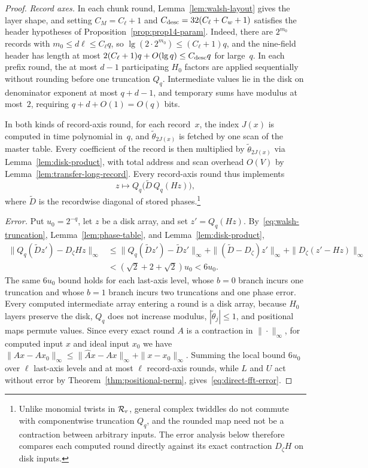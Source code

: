 \begin{proof}
\emph{Record axes.} In each chunk round, Lemma~\ref{lem:walsh-layout} gives the layer shape, and setting
$C_M=C_\ell+1$ and $C_{\rm desc}=32(C_\ell+C_w+1)$ satisfies the header hypotheses of
Proposition~\ref{prop:prop14-param}. Indeed, there are $2^{m_0}$ records with $m_0\le d\ell\le C_\ell q$, so
$\lg(2\cdot2^{m_0})\le(C_\ell+1)q$, and the nine-field header has length at most $2(C_\ell+1)q+O(\lg q)\le C_{\rm desc}q$
for large~$q$. In each prefix round, the at most $d-1$ participating $H_0$ factors are applied sequentially without
rounding before one truncation $Q_q$. Intermediate values lie in the disk on denominator exponent at most $q+d-1$, and
temporary sums have modulus at most~$2$, requiring $q+d+O(1)=O(q)$ bits.

In both kinds of record-axis round, for each record~$x$, the index $J(x)$ is computed in time polynomial in~$q$, and
$\tilde\theta_{2J(x)}$ is fetched by one scan of the master table. Every coefficient of the record is then multiplied by
$\tilde\theta_{2J(x)}$ via Lemma~\ref{lem:disk-product}, with total address and scan overhead $O(V)$ by
Lemma~\ref{lem:transfer-long-record}. Every record-axis round thus implements
\begin{equation}\label{eq:round-protocol}
  z\mapsto Q_q\bigl(\tilde D\,Q_q(Hz)\bigr),
\end{equation}
where $\tilde D$ is the recordwise diagonal of stored phases.\footnote{Unlike monomial twists in $\mathcal{R}_r$, general
complex twiddles do not commute with componentwise truncation $Q_q$, and the rounded map need not be a contraction
between arbitrary inputs. The error analysis below therefore compares each computed round directly against its exact
contraction $D_\zeta H$ on disk inputs.}

\emph{Error.} Put $u_0=2^{-q}$, let $z$ be a disk array, and set $z'=Q_q(Hz)$. By~\eqref{eq:walsh-truncation},
Lemma~\ref{lem:phase-table}, and Lemma~\ref{lem:disk-product},
\begin{align*}
  \|Q_q(\tilde Dz')-D_\zeta Hz\|_\infty
  &\le\|Q_q(\tilde Dz')-\tilde Dz'\|_\infty+\|(\tilde D-D_\zeta)z'\|_\infty+\|D_\zeta(z'-Hz)\|_\infty\\
  &<(\sqrt2+2+\sqrt2)u_0<6u_0 .
\end{align*}
The same $6u_0$ bound holds for each last-axis level, whose $b=0$ branch incurs one truncation and whose $b=1$ branch
incurs two truncations and one phase error. Every computed intermediate array entering a round is a disk array, because
$H_0$ layers preserve the disk, $Q_q$ does not increase modulus, $|\tilde\theta_j|\le1$, and positional maps permute
values. Since every exact round $A$ is a contraction in $\|\cdot\|_\infty$, for computed input $x$ and ideal input $x_0$
we have $\|\widehat Ax-Ax_0\|_\infty\le\|\widehat Ax-Ax\|_\infty+\|x-x_0\|_\infty$. Summing the local bound $6u_0$ over
$\ell$ last-axis levels and at most $\ell$ record-axis rounds, while $L$ and $U$ act without error by
Theorem~\ref{thm:positional-perm}, gives~\eqref{eq:direct-fft-error}.


\end{proof}
